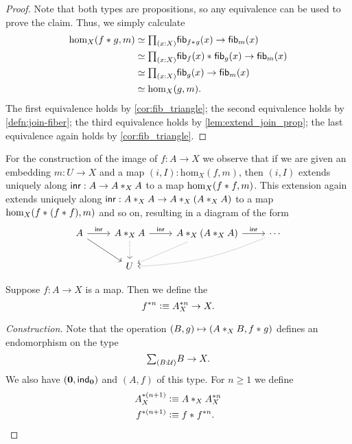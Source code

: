 \begin{proof}
Note that both types are propositions, so any equivalence can be used to prove the claim. Thus, we simply calculate
\begin{align*}
\mathrm{hom}_X(\join{f}{g},m) & \eqvsym \prd{x:X}\fib{\join{f}{g}}{x}\to \fib{m}{x} \\
& \eqvsym \prd{x:X}\join{\fib{f}{x}}{\fib{g}{x}}\to\fib{m}{x} \\
& \eqvsym \prd{x:X}\fib{g}{x}\to\fib{m}{x} \\
& \eqvsym \mathrm{hom}_X(g,m).
\end{align*}
The first equivalence holds by \cref{cor:fib_triangle}; the second equivalence holds by \cref{defn:join-fiber}; the third equivalence holds by \cref{lem:extend_join_prop}; the last equivalence again holds by \cref{cor:fib_triangle}.
\end{proof}

For the construction of the image of $f:A\to X$ we observe that if we are given an embedding $m:U\to X$ and a map $(i,I):\mathrm{hom}_X(f,m)$, then $(i,I)$ extends uniquely along $\inr:A\to \join[X]{A}{A}$ to a map $\mathrm{hom}_X(\join{f}{f},m)$. This extension again extends uniquely along $\inr:\join[X]{A}{A}\to \join[X]{A}{(\join[X]{A}{A})}$ to a map $\mathrm{hom}_X(\join{f}{(\join{f}{f})},m)$ and so on, resulting in a diagram of the form
\begin{equation*}
\begin{tikzcd}
A \arrow[dr] \arrow[r,"\inr"] & \join[X]{A}{A} \arrow[d,densely dotted] \arrow[r,"\inr"] & \join[X]{A}{(\join[X]{A}{A})} \arrow[dl,densely dotted] \arrow[r,"\inr"] & \cdots \arrow[dll,densely dotted,bend left=10] \\
& U
\end{tikzcd}
\end{equation*}

\begin{defn}
Suppose $f:A\to X$ is a map. Then we define the  
\begin{equation*}
f^{\ast n}\defeq A_X^{\ast n}\to X.
\end{equation*}
\end{defn}

\begin{proof}[Construction]
Note that the operation $(B,g)\mapsto (\join[X]{A}{B},\join{f}{g})$ defines an endomorphism on the type
\begin{equation*}
\sm{B:\UU}B\to X.
\end{equation*}
We also have $(\emptyt,\ind{\emptyt})$ and $(A,f)$ of this type. For $n\geq 1$ we define
\begin{align*}
A_X^{\ast (n+1)} & \defeq \join[X]{A}{A_X^{\ast n}} \\
f^{\ast (n+1)} & \defeq \join{f}{f^{\ast n}}.\qedhere
\end{align*}
\end{proof}

